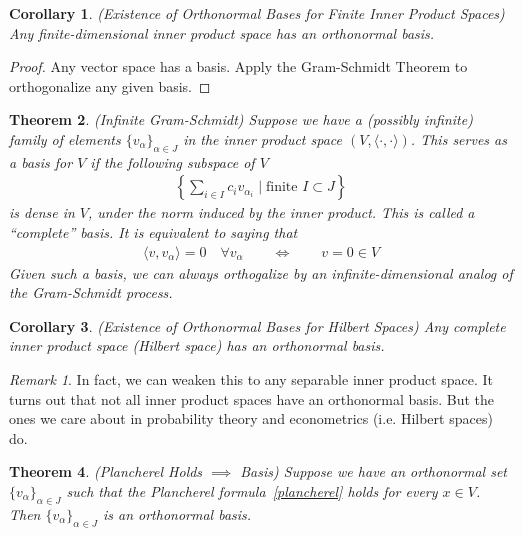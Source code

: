 \documentclass[12pt]{book}
\numberwithin{equation}{section} %
\theoremstyle{plain}
\newtheorem{thm}{Theorem}[section]
\newtheorem{cor}[thm]{Corollary}
\theoremstyle{definition}
\theoremstyle{remark}
\newtheorem*{rmk}{Remark}
\newcommand{\R}{\mathbb{R}}
\newcommand{\C}{\mathbb{C}}
\begin{document}
\begin{cor}
\emph{(Existence of Orthonormal Bases for Finite Inner Product Spaces)}
Any finite-dimensional inner product space has an orthonormal basis.
\end{cor}
\begin{proof}
Any vector space has a basis.
Apply the Gram-Schmidt Theorem to orthogonalize any given basis.
\end{proof}



\begin{thm}
\emph{(Infinite Gram-Schmidt)}
Suppose we have a (possibly infinite) family of elements
$\{v_\alpha\}_{\alpha\in J}$ in the inner product space
$(V,\langle\cdot,\cdot\rangle)$.
This serves as a basis for $V$ if the following subspace of $V$
\begin{align*}
  \left\{
    \sum_{i\in I} c_i v_{\alpha_i}
    \;\big|\;
    \text{finite $I\subset J$}
  \right\}
\end{align*}
is dense in $V$, under the norm induced by the inner product.
This is called a ``complete'' basis.
It is equivalent to saying that
\begin{align*}
  \langle v,v_\alpha\rangle = 0
  \quad\forall v_\alpha
  \qquad\iff\qquad v=0\in V
\end{align*}
Given such a basis, we can always orthogalize by an infinite-dimensional
analog of the Gram-Schmidt process.
\end{thm}

\begin{cor}\emph{(Existence of Orthonormal Bases for Hilbert Spaces)}
Any complete inner product space (Hilbert space) has an orthonormal basis.
\end{cor}
\begin{rmk}
In fact, we can weaken this to any separable inner product space.
It turns out that not all inner product spaces have an orthonormal
basis.
But the ones we care about in probability theory and econometrics (i.e.
Hilbert spaces) do.
\end{rmk}


\begin{thm}
\label{thm:plancherelbasis}
\emph{(Plancherel Holds $\implies$ Basis)}
Suppose we have an orthonormal set $\{v_\alpha\}_{\alpha\in J}$ such
that the Plancherel formula~\ref{plancherel} holds for every
$x\in V$.
Then $\{v_\alpha\}_{\alpha\in J}$ is an orthonormal basis.
\end{thm}
\end{document}
